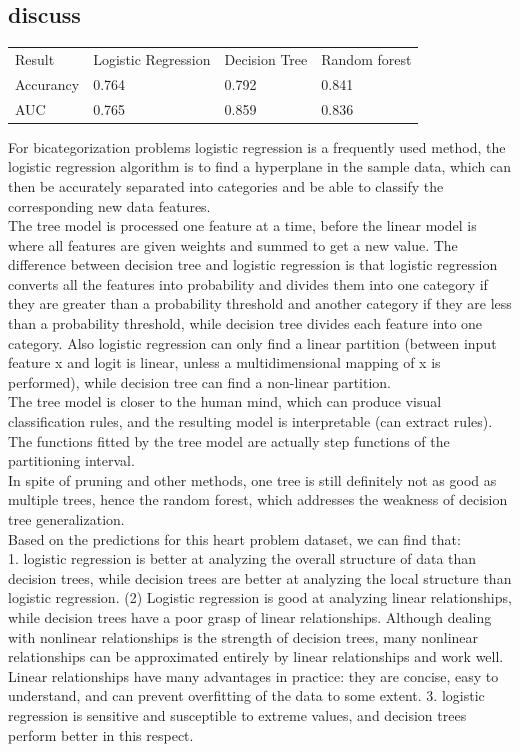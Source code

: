 \documentclass{article}
\begin{document}
\subsection{discuss}
\begin{table}[H]
  \centering
  \begin{tabular}{llll}
  Result    & Logistic Regression & Decision Tree & Random forest \\ \cline{2-4} 
  Accurancy & 0.764               & 0.792         & 0.841         \\ \cline{2-4} 
  AUC       & 0.765               & 0.859         & 0.836         \\ \cline{2-4} 
  \end{tabular}
\end{table}
For bicategorization problems logistic regression is a frequently used method, the logistic regression algorithm is to find a hyperplane in the sample data, which can then be accurately separated into categories and be able to classify the corresponding new data features.\\
The tree model is processed one feature at a time, before the linear model is where all features are given weights and summed to get a new value. The difference between decision tree and logistic regression is that logistic regression converts all the features into probability and divides them into one category if they are greater than a probability threshold and another category if they are less than a probability threshold, while decision tree divides each feature into one category. Also logistic regression can only find a linear partition (between input feature x and logit is linear, unless a multidimensional mapping of x is performed), while decision tree can find a non-linear partition.\\
The tree model is closer to the human mind, which can produce visual classification rules, and the resulting model is interpretable (can extract rules). The functions fitted by the tree model are actually step functions of the partitioning interval.\\
In spite of pruning and other methods, one tree is still definitely not as good as multiple trees, hence the random forest, which addresses the weakness of decision tree generalization.\\
Based on the predictions for this heart problem dataset, we can find that: \\
1. logistic regression is better at analyzing the overall structure of data than decision trees, while decision trees are better at analyzing the local structure than logistic regression.
(2) Logistic regression is good at analyzing linear relationships, while decision trees have a poor grasp of linear relationships. Although dealing with nonlinear relationships is the strength of decision trees, many nonlinear relationships can be approximated entirely by linear relationships and work well. Linear relationships have many advantages in practice: they are concise, easy to understand, and can prevent overfitting of the data to some extent.
3. logistic regression is sensitive and susceptible to extreme values, and decision trees perform better in this respect.
\end{document}

